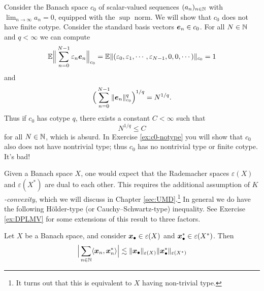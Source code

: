 \begin{example}
  Consider the Banach space $c_{0}$ of scalar-valued sequences $(a_{n})_{n \in \mathbb{N}}$ with $\lim_{n \to \infty} a_{n} = 0$, equipped with the $\sup$ norm.
  We will show that $c_{0}$ does not have finite cotype.
  Consider the standard basis vectors $\bm{e}_{n} \in c_{0}$.
  For all $N \in \mathbb{N}$ and $q < \infty$ we can compute
  \begin{equation*}
    \mathbb{E} \Big\| \sum_{n = 0}^{N-1} \varepsilon_{n} \bm{e}_{n} \Big\|_{c_0}
    = \mathbb{E} \| (\varepsilon_{0}, \varepsilon_{1}, \cdots, \varepsilon_{N-1}, 0, 0, \cdots) \|_{c_{0}} = 1
  \end{equation*}
  and
  \begin{equation*}
    \Big( \sum_{n=0}^{N-1} \|\bm{e}_{n}\|_{c_0}^{q} \Big)^{1/q} = N^{1/q}.
  \end{equation*}
  Thus if $c_{0}$ has cotype $q$, there exists a constant $C < \infty$ such that
  \begin{equation*}
    N^{1/q} \leq C
  \end{equation*}
  for all $N \in \mathbb{N}$, which is absurd.
  In Exercise \ref{ex:c0-notype} you will show that $c_{0}$ also does not have nontrivial type; thus $c_{0}$ has no nontrivial type or finite cotype. It's bad!
  
\end{example}

Given a Banach space $X$, one would expect that the Rademacher spaces $\varepsilon(X)$ and $\varepsilon(X^{*})$ are dual to each other.
This requires the additional assumption of \emph{$K$-convexity}, which we will discuss in Chapter \ref{sec:UMD}.\footnote{It turns out that this is equivalent to $X$ having non-trivial type.}
In general we do have the following H\"older-type (or Cauchy--Schwartz-type) inequality.
See Exercise \ref{ex:DPLMV} for some extensions of this result to three factors.

\begin{prop}
  Let $X$ be a Banach space, and consider $\bm{x}_{\bullet} \in \varepsilon(X)$ and $\bm{x}_{\bullet}^{*} \in \varepsilon(X^{*})$.
  Then
  \begin{equation*}
    \Big| \sum_{n \in \mathbb{N}} \langle \bm{x}_{n}, \bm{x}_{n}^{*} \rangle \Big| \lesssim \|\bm{x}_{\bullet}\|_{\varepsilon(X)} \|\bm{x}_{\bullet}^{*}\|_{\varepsilon(X^{*})} 
  \end{equation*}
\end{prop}

